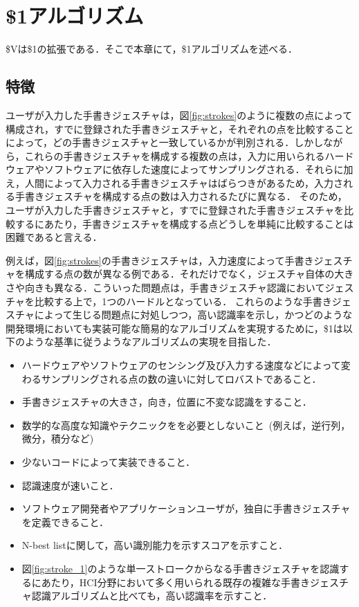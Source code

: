 \chapter{\$1アルゴリズム}
\$Vは\$1の拡張である．そこで本章にて，\$1アルゴリズムを述べる．

\section{特徴}
ユーザが入力した手書きジェスチャは，図\ref{fig:strokes}のように複数の点によって構成され，すでに登録された手書きジェスチャと，それぞれの点を比較することによって，どの手書きジェスチャと一致しているかが判別される．しかしながら，これらの手書きジェスチャを構成する複数の点は，入力に用いられるハードウェアやソフトウェアに依存した速度によってサンプリングされる．それらに加え，人間によって入力される手書きジェスチャはばらつきがあるため，入力される手書きジェスチャを構成する点の数は入力されるたびに異なる．
そのため，ユーザが入力した手書きジェスチャと，すでに登録された手書きジェスチャを比較するにあたり，手書きジェスチャを構成する点どうしを単純に比較することは困難であると言える．


例えば，図\ref{fig:strokes}の手書きジェスチャは，入力速度によって手書きジェスチャを構成する点の数が異なる例である．それだけでなく，ジェスチャ自体の大きさや向きも異なる．こういった問題点は，手書きジェスチャ認識においてジェスチャを比較する上で，1つのハードルとなっている．
これらのような手書きジェスチャによって生じる問題点に対処しつつ，高い認識率を示し，かつどのような開発環境においても実装可能な簡易的なアルゴリズムを実現するために，\$1は以下のような基準に従うようなアルゴリズムの実現を目指した．

\begin{itemize}
\item ハードウェアやソフトウェアのセンシング及び入力する速度などによって変わるサンプリングされる点の数の違いに対してロバストであること．
\item 手書きジェスチャの大きさ，向き，位置に不変な認識をすること．
\item 数学的な高度な知識やテクニックをを必要としないこと~(例えば，逆行列，微分，積分など)
\item 少ないコードによって実装できること．
\item 認識速度が速いこと．
\item ソフトウェア開発者やアプリケーションユーザが，独自に手書きジェスチャを定義できること．
\item N-best listに関して，高い識別能力を示すスコアを示すこと．
\item 図\ref{fig:stroke_1}のような単一ストロークからなる手書きジェスチャを認識するにあたり，HCI分野において多く用いられる既存の複雑な手書きジェスチャ認識アルゴリズムと比べても，高い認識率を示すこと．
\end{itemize}

